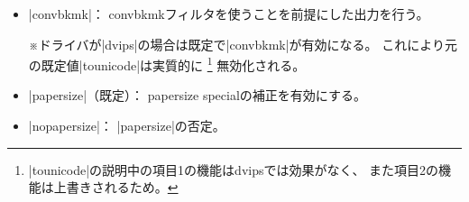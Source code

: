 \documentclass[uplatex,dvipdfmx,a4paper]{jsarticle}
\newcommand{\Note}{\par\noindent ※}
\newcommand{\Means}{：\quad}
\newcommand{\／}{\mbox{}／\mbox{}}
\begin{document}
\begin{itemize}
\item |convbkmk|\Means
  convbkmkフィルタを使うことを前提にした出力を行う。
  \Note ドライバが|dvips|の場合は既定で|convbkmk|が有効になる。
  これにより元の既定値|tounicode|は実質的に
  \footnote{|tounicode|の説明中の項目1の機能はdvipsでは効果がなく、
    また項目2の機能は上書きされるため。}%
  無効化される。
\item |papersize|（既定）\Means
  papersize specialの補正を有効にする。
\item |nopapersize|\Means
  |papersize|の否定。
\end{itemize}
\end{document}
